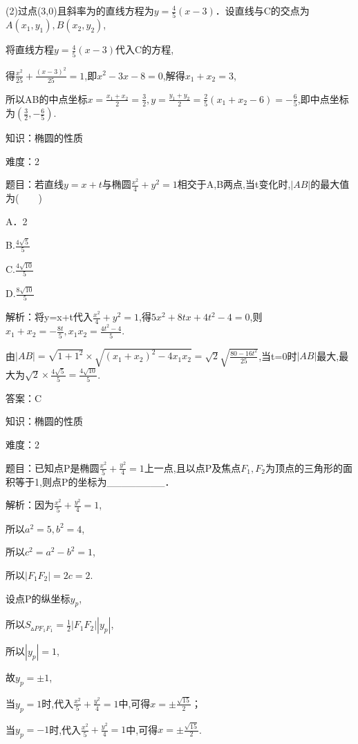 \documentclass{article} %
\begin{document}
(2)过点(3,0)且斜率为的直线方程为$y=\frac{4}{5}(x-3)$．设直线与C的交点为$A(x_{1},y_{1}),B(x_{2},y_{2})$,

将直线方程$y=\frac{4}{5}(x-3)$代入C的方程,

得$\frac{x^2}{25}+\frac{(x-3)^2}{25}=1$,即$x^{2}-3x-8=0$,解得$x_{1}+x_{2}=3$,

所以AB的中点坐标$x=\frac{x_1+x_2}{2}=\frac{3}{2},y=\frac{y_1+y_2}{2}=\frac{2}{5}(x_1+x_2-6)=-\frac{6}{5}$,即中点坐标为$(\frac{3}{2},-\frac{6}{5})$.



知识：椭圆的性质

难度：2

题目：若直线$y=x+t$与椭圆$\frac{x^2}{4}+y^{2}=1$相交于A,B两点,当t变化时,$|AB|$的最大值为(　　)

A．2   

B.$\frac{4\sqrt{5}}{5}$

C.$\frac{4\sqrt{10}}{5}$

D.$\frac{8\sqrt{10}}{5}$

解析：将y=x+t代入$\frac{x^2}{4}+y^{2}=1$,得$5x^{2}+8tx+4t^{2}-4=0$,则$x_{1}+x_{2}=-\frac{8t}{5},x_{1}x_{2}=\frac{4t^2-4}{5}$.

由$|AB|=\sqrt{1+1^2}\times \sqrt{(x_1+x_2)^2-4x_1x_2}=\sqrt{2}\sqrt{\frac{80-16t^2}{25}}$,当t=0时$|AB|$最大,最大为$\sqrt{2}\times \frac{4\sqrt{5}}{5}=\frac{4\sqrt{10}}{5}$.

答案：C



知识：椭圆的性质

难度：2

题目：已知点P是椭圆$\frac{x^2}{5}+\frac{y^2}{4}=1$上一点,且以点P及焦点$F_{1},F_{2}$为顶点的三角形的面积等于1,则点P的坐标为\_\_\_\_\_\_\_\_．

解析：因为$\frac{x^2}{5}+\frac{y^2}{4}=1$,

所以$a^{2}=5,b^{2}=4$,

所以$c^{2}=a^{2}-b^{2}=1$,

所以$|F_1F_2|=2c=2$.

设点P的纵坐标$y_{p}$,

所以$S_{\vartriangle PF_{1}F_{1}}=\frac{1}{2}|F_1F_2||y_p|$,

所以$|y_p|=1$,

故$y_{p}={\pm}1$,

当$y_{p}=1$时,代入$\frac{x^2}{5}+\frac{y^2}{4}=1$中,可得$x={\pm}\frac{\sqrt{15}}{2}$；

当$y_{p}=-1$时,代入$\frac{x^2}{5}+\frac{y^2}{4}=1$中,可得$x={\pm}\frac{\sqrt{15}}{2}$.
\end{document}
